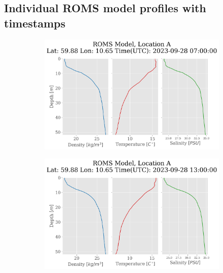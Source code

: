 \documentclass[a4paper,10pt,english]{article}
\begin{document}
    
    \subsection{Individual ROMS model profiles with timestamps}\label{app:model}
    \begin{figure}[H]
            \begin{adjustwidth}{-2.5cm}{-2.5cm}  %
            \begin{subfigure}{0.65\textwidth}
                \centering
                \includegraphics[width=1.\linewidth]{../figures/model_profiles/model_profiles_A_2023_09_28_07.png}
                \caption{}
                \label{fig:model_A07}
            \end{subfigure}%
            \begin{subfigure}{0.65\textwidth}
                \centering
                \includegraphics[width=1.\linewidth]{../figures/model_profiles/model_profiles_A_2023_09_28_13.png}
                \caption{}
                \label{fig:model_A13}
            \end{subfigure}
        

\end{adjustwidth}
\end{figure}
\end{document}
